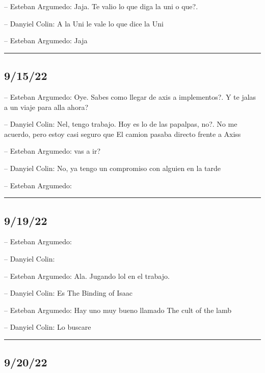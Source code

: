 -- Esteban Argumedo: Jaja. Te valio lo que diga la uni o que?.

-- Danyiel Colin: A la Uni le vale lo que dice la Uni

-- Esteban Argumedo: Jaja

\begin{center}\rule{0.5\linewidth}{0.5pt}\end{center}

\hypertarget{section-153}{%
\subsection{9/15/22}\label{section-153}}

-- Esteban Argumedo: Oye. Sabes como llegar de axis a implementos?. Y te
jalas a un viaje para alla ahora?

-- Danyiel Colin: Nel, tengo trabajo. Hoy es lo de las papalpas, no?. No
me acuerdo, pero estoy casi seguro que El camion pasaba directo frente a
Axiss

-- Esteban Argumedo: vas a ir?

-- Danyiel Colin: No, ya tengo un compromiso con alguien en la tarde

-- Esteban Argumedo:

\begin{center}\rule{0.5\linewidth}{0.5pt}\end{center}

\hypertarget{section-154}{%
\subsection{9/19/22}\label{section-154}}

-- Esteban Argumedo:

-- Danyiel Colin:

-- Esteban Argumedo: Ala. Jugando lol en el trabajo.

-- Danyiel Colin: Es The Binding of Isaac

-- Esteban Argumedo: Hay uno muy bueno llamado The cult of the lamb

-- Danyiel Colin: Lo buscare

\begin{center}\rule{0.5\linewidth}{0.5pt}\end{center}

\hypertarget{section-155}{%
\subsection{9/20/22}\label{section-155}}

